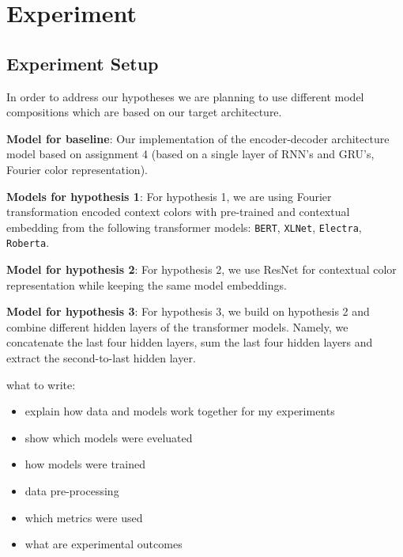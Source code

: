 \section{Experiment}

\subsection{Experiment Setup}
In order to address our hypotheses we are planning to use different model compositions which are based on our target architecture.

\bigbreak
\textbf{Model for baseline}:
Our implementation of the encoder-decoder architecture model based on assignment 4 (based on a single layer of RNN’s and GRU’s, Fourier color representation).

\bigbreak
\textbf{Models for hypothesis 1}:
For hypothesis 1, we are using Fourier transformation encoded context colors with pre-trained and contextual embedding from the following transformer models: \texttt{BERT}, \texttt{XLNet}, \texttt{Electra}, \texttt{Roberta}.

\bigbreak
\textbf{Model for hypothesis 2}:
For hypothesis 2, we use ResNet for contextual color representation while keeping the same model embeddings.

\bigbreak
\textbf{Model for hypothesis 3}:
For hypothesis 3, we build on hypothesis 2 and combine different hidden layers of the transformer models. Namely, we concatenate the last four hidden layers, sum the last four hidden layers and extract the second-to-last hidden layer.

\bigbreak
what to write:
\begin{itemize}
  \item explain how data and models work together for my experiments
  \item show which models were eveluated
  \item how models were trained
  \item data pre-processing
  \item which metrics were used
  \item what are experimental outcomes
\end{itemize}